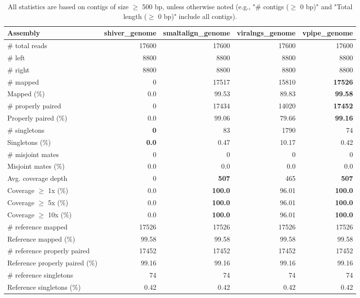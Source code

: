 \documentclass[12pt,a4paper]{article}
\begin{document}
\begin{table}[ht]
\begin{center}
\caption{All statistics are based on contigs of size $\geq$ 500 bp, unless otherwise noted (e.g., "\# contigs ($\geq$ 0 bp)" and "Total length ($\geq$ 0 bp)" include all contigs).}
\begin{tabular}{|l*{4}{|r}|}
\hline
Assembly & shiver\_genome & smaltalign\_genome & viralngs\_genome & vpipe\_genome \\ \hline
\# total reads & 17600 & 17600 & 17600 & 17600 \\ \hline
\# left & 8800 & 8800 & 8800 & 8800 \\ \hline
\# right & 8800 & 8800 & 8800 & 8800 \\ \hline
\# mapped & 0 & 17517 & 15810 & {\bf 17526} \\ \hline
Mapped (\%) & 0.0 & 99.53 & 89.83 & {\bf 99.58} \\ \hline
\# properly paired & 0 & 17434 & 14020 & {\bf 17452} \\ \hline
Properly paired (\%) & 0.0 & 99.06 & 79.66 & {\bf 99.16} \\ \hline
\# singletons & {\bf 0} & 83 & 1790 & 74 \\ \hline
Singletons (\%) & {\bf 0.0} & 0.47 & 10.17 & 0.42 \\ \hline
\# misjoint mates & 0 & 0 & 0 & 0 \\ \hline
Misjoint mates (\%) & 0.0 & 0.0 & 0.0 & 0.0 \\ \hline
Avg. coverage depth & 0 & {\bf 507} & 465 & {\bf 507} \\ \hline
Coverage $\geq$ 1x (\%) & 0.0 & {\bf 100.0} & 96.01 & {\bf 100.0} \\ \hline
Coverage $\geq$ 5x (\%) & 0.0 & {\bf 100.0} & 96.01 & {\bf 100.0} \\ \hline
Coverage $\geq$ 10x (\%) & 0.0 & {\bf 100.0} & 96.01 & {\bf 100.0} \\ \hline
\# reference mapped & 17526 & 17526 & 17526 & 17526 \\ \hline
Reference mapped (\%) & 99.58 & 99.58 & 99.58 & 99.58 \\ \hline
\# reference properly paired & 17452 & 17452 & 17452 & 17452 \\ \hline
Reference properly paired (\%) & 99.16 & 99.16 & 99.16 & 99.16 \\ \hline
\# reference singletons & 74 & 74 & 74 & 74 \\ \hline
Reference singletons (\%) & 0.42 & 0.42 & 0.42 & 0.42 \\ \hline

\end{tabular}
\end{center}
\end{table}
\end{document}
